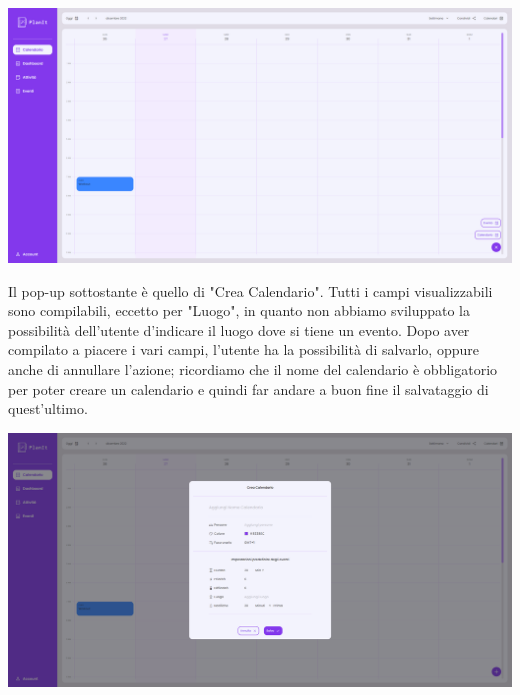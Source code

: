 \begin{center}
    \includegraphics[width=1\textwidth, height=0.3\textheight]{img/png/FrontEnd/Calendario/calendario_creazione.png}
\end{center}

Il pop-up sottostante è quello di "Crea Calendario". Tutti i campi visualizzabili sono compilabili, eccetto per "Luogo", in quanto non abbiamo sviluppato la possibilità dell'utente d'indicare il luogo dove si tiene un evento. Dopo aver compilato a piacere i vari campi, l'utente ha la possibilità di salvarlo, oppure anche di annullare l'azione; ricordiamo che il nome del calendario è obbligatorio per poter creare un calendario e quindi far andare a buon fine il salvataggio di quest'ultimo.

\begin{center}
    \includegraphics[width=1\textwidth, height=0.3\textheight]{img/png/FrontEnd/Calendario/calendario_creaCalendario.png}
\end{center}

